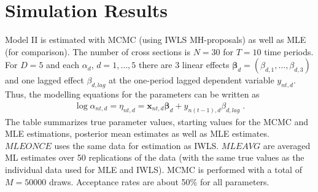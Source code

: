 \documentclass[a4paper,12pt]{scrartcl} %
\newcommand{\bs}{\boldsymbol}  %
\newcommand{\antd}{\alpha_{nt,d}}
\newcommand{\etantd}{\eta_{nt,d}}
\begin{document}
\section{Simulation Results}
Model II is estimated with MCMC (using IWLS MH-proposals) as well as MLE (for comparison). The number of cross sections is $N=30$ for $T=10$ time periods. For $D=5$ and each $\alpha_d$, $d=1,\dots,5$ there are 3 linear effects $\bs{\beta}_d=(\beta_{d,1},\ldots,\beta_{d,3})$ and one lagged effect $\beta_{d,lag}$ at the one-period lagged dependent variable $y_{nt,d}$. Thus, the modelling equations for the parameters can be written as
\begin{align*}
\log \antd = \etantd = \bs{x}_{nt,d}\bs{\beta}_{d} + y_{n(t-1),d} \beta_{d,lag}\;.
\end{align*}
The table summarizes true parameter values, starting values for the MCMC and MLE estimations, posterior mean estimates as well as MLE estimates. $MLE ONCE$ uses the same data for estimation as IWLS. $MLE AVG$ are averaged ML estimates over 50 replications of the data (with the same true values as the individual data used for MLE and IWLS). MCMC is performed with a total of $M=50000$ draws. Acceptance rates are about 50\% for all parameters.
\end{document}
